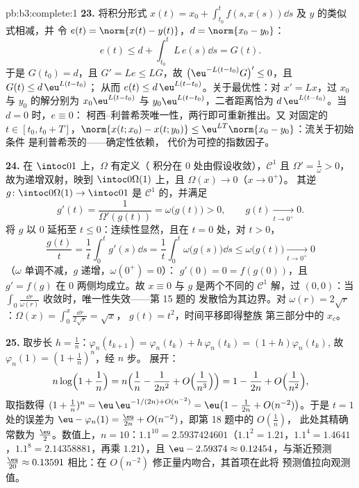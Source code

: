 \begin{solution}{pb:b3:complete:1}
\textbf{23.} 将积分形式 $x(t) = x_0 +
\int_{t_0}^tf(s, x(s))\dd s$ 及 $y$ 的类似式相减，并
令 $e(t) = \norm{x(t) - y(t)}$，$d = \norm{x_0 - y_0}$：
\[
e(t) \leq d + \int_{t_0}^tL\,e(s)\dd s = G(t).
\]
于是 $G(t_0) = d$，且 $G' = Le \leq LG$，故 $\bigl(\eu^{-L(t
- t_0)}G\bigr)' \leq 0$，且 $G(t) \leq d\,\eu^{L(t - t_0)}$；
从而 $e(t) \leq d\,\eu^{L(t-t_0)}$。关于最优性：对 $x' =
Lx$，过 $x_0$ 与 $y_0$ 的解分别为 $x_0\eu^{L(t -
t_0)}$ 与 $y_0\eu^{L(t-t_0)}$，二者距离恰为
$d\,\eu^{L(t-t_0)}$。当 $d = 0$ 时，$e \equiv 0$：
柯西--利普希茨唯一性，两行即可重新推出。又
对固定的 $t \in [t_0, t_0 + T]$，$\norm{x(t; x_0) - x(t;
y_0)} \leq \eu^{LT}\norm{x_0 - y_0}$：流关于初始条件
是利普希茨的——确定性依赖，
代价为可控的指数因子。

\textbf{24.} 在 $\intoc01$ 上，$\Omega$ 有定义（
积分在 $0$ 处由假设收敛），$\mathcal C^1$ 且
$\Omega' = \frac1\omega > 0$，故为递增双射，映到
$\intoc0{\Omega(1)}$ 上，且 $\Omega(x) \to 0$（$x \to 0^+$）。
其逆 $g \colon \intoc0{\Omega(1)} \to \intoc01$ 是
$\mathcal C^1$ 的，并满足
\[
g'(t) = \frac1{\Omega'(g(t))} = \omega\bigl(g(t)\bigr) > 0,
\qquad g(t) \xrightarrow[t \to 0^+]{} 0 .
\]
将 $g$ 以 $0$ 延拓至 $t \leq 0$：连续性显然，且在
$t = 0$ 处，对 $t > 0$，
\[
\frac{g(t)}t = \frac1t\int_0^tg'(s)\dd s
= \frac1t\int_0^t\omega\bigl(g(s)\bigr)\dd s
\leq \omega\bigl(g(t)\bigr) \xrightarrow[t\to0^+]{} 0
\]
（$\omega$ 单调不减，$g$ 递增，$\omega(0^+) = 0$）：
$g'(0) = 0 = f(g(0))$，且 $g' = f(g)$ 在
$0$ 两侧均成立。故 $x \equiv 0$ 与 $g$ 是两个不同的 $\mathcal
C^1$ 解，过 $(0, 0)$：当 $\int_0\frac{\dd r}
{\omega(r)}$ 收敛时，唯一性失效——第 15 题的
发散恰为其边界。对 $\omega(r) = 2\sqrt
r$：$\Omega(x) = \int_0^x\frac{\dd r}{2\sqrt r} = \sqrt x$，
$g(t) = t^2$，时间平移即得整族
第三部分中的 $x_c$。

\textbf{25.} 取步长 $h = \frac1n$：$\varphi_n(t_{k+1}) =
\varphi_n(t_k) + h\,\varphi_n(t_k) = (1 + h)\varphi_n(t_k)$,
故 $\varphi_n(1) = (1 + \frac1n)^n$，经 $n$ 步。
展开：
\[
n\log\Bigl(1 + \frac1n\Bigr)
= n\Bigl(\frac1n - \frac1{2n^2} + O\Bigl(\frac1{n^3}\Bigr)
\Bigr) = 1 - \frac1{2n} + O\Bigl(\frac1{n^2}\Bigr),
\]
取指数得 $(1 + \frac1n)^n = \eu\,\eu^{-1/(2n) +
O(n^{-2})} = \eu\bigl(1 - \frac1{2n} + O(n^{-2})\bigr)$。于是
$t = 1$ 处的误差为 $\eu - \varphi_n(1) =
\frac{\eu}{2n} + O(n^{-2})$，即第 18 题中的 $O(\frac1n)$，
此处其精确常数为 $\frac\eu2$。数值上，$n =
10$：$1.1^{10} = 2.5937424601$（$1.1^2 = 1.21$，$1.1^4 =
1.4641$，$1.1^8 = 2.14358881$，再乘 $1.21$），且 $\eu -
2.59374 \approx 0.12454$，与渐近预测
$\frac{\eu}{20} \approx 0.13591$ 相比：在
$O(n^{-2})$ 修正量内吻合，其首项在此将
预测值拉向观测值。
\end{solution}
